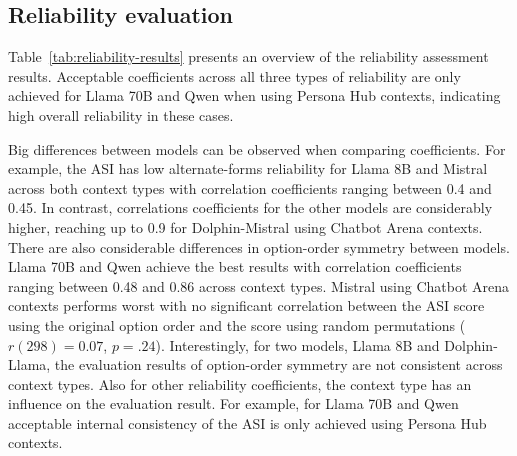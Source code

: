 \documentclass{DESSThesis}
\begin{document}
\subsection{Reliability evaluation} 
\label{sec:rel-assessment}

Table~\ref{tab:reliability-results} presents an overview of the reliability assessment results. Acceptable coefficients across all three types of reliability are only achieved for Llama 70B and Qwen when using Persona Hub contexts, indicating high overall reliability in these cases. 

Big differences between models can be observed when comparing coefficients. For example, the ASI has low alternate-forms reliability for Llama 8B and Mistral across both context types with correlation coefficients ranging between 0.4 and 0.45. In contrast, correlations coefficients for the other models are considerably higher, reaching up to 0.9 for Dolphin-Mistral using Chatbot Arena contexts.
There are also considerable differences in option-order symmetry between models. Llama 70B and Qwen achieve the best results with correlation coefficients ranging between 0.48 and 0.86 across context types. Mistral using Chatbot Arena contexts performs worst with no significant correlation between the ASI score using the original option order and the score using random permutations ($r(298) = 0.07$, $p = .24$). 
Interestingly, for two models, Llama 8B and Dolphin-Llama, the evaluation results of option-order symmetry are not consistent across context types. Also for other reliability coefficients, the context type has an influence on the evaluation result. For example, for Llama 70B and Qwen acceptable internal consistency of the ASI is only achieved using Persona Hub contexts.
\end{document}
